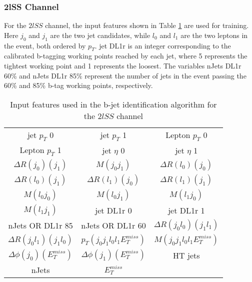\subsubsection{2lSS Channel}
\label{subsec:top2lSS}

For the $2lSS$ channel, the input features shown in Table \ref{tab:top2lSSfeatures} are used for training. Here $j_0$ and $j_1$ are the two jet candidates, while $l_0$ and $l_1$ are the two leptons in the event, both ordered by $p_T$. jet DL1r is an integer corresponding to the calibrated b-tagging working points reached by each jet, where 5 represents the tightest working point and 1 represents the loosest. The variables nJets DL1r 60\% and nJets DL1r 85\% represent the number of jets in the event passing the 60\% and 85\% b-tag working points, respectively.

\begin{table}[H]
  \begin{center}
  \begin{tabular}{ccc}
  \hline\hline
    jet  $p_T$ 0 & jet  $p_T$ 1 & Lepton  $p_T$ 0 \\
    Lepton  $p_T$ 1 & jet  $\eta$ 0 & jet  $\eta$ 1 \\
    $\Delta R(j_0)(j_1)$ & $M(j_0j_1)$ & $\Delta R(l_0)(j_0)$ \\
    $\Delta R(l_0)(j_1)$ & $\Delta R(l_1)(j_0)$ & $\Delta R(l_1)(j_1)$ \\
    $M(l_0j_0)$ & $M(l_0j_1)$ & $M(l_1j_0)$ \\
    $M(l_1j_1)$ & jet DL1r 0 & jet DL1r 1 \\
    nJets OR DL1r 85 & nJets OR DL1r 60 & $\Delta R(j_0l_0)(j_1l_1)$ \\
    $\Delta R(j_0l_1)(j_1l_0)$ &  $p_T(j_0j_1l_0l_1E_T^{miss})$ & $M(j_0j_1l_0l_1E_T^{miss})$ \\
    $\Delta\phi(j_0)(E_T^{miss})$ & $\Delta\phi(j_1)(E_T^{miss})$ & HT jets \\
    nJets & $E_T^{miss}$ & \\
  \hline
  \end{tabular}
  \end{center}
  \caption{Input features used in the b-jet identification algorithm for the $2lSS$ channel}
  \label{tab:top2lSSfeatures}                                                                                               
\end{table}


